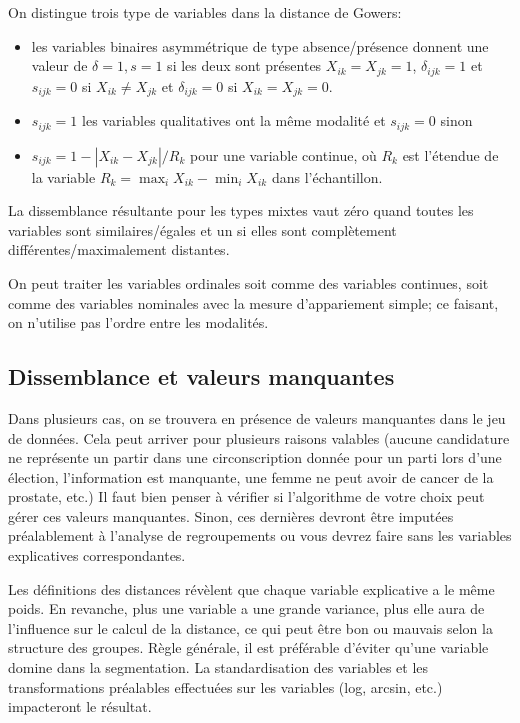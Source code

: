 \documentclass[
  11pt,
  letterpaper,
]{scrbook}
\providecommand{\tightlist}{%
  \setlength{\itemsep}{0pt}\setlength{\parskip}{0pt}}\usepackage{longtable,booktabs,array}
\theoremstyle{definition}
\theoremstyle{remark}
\begin{document}
On distingue trois type de variables dans la distance de Gowers:

\begin{itemize}
\tightlist
\item
  les variables binaires asymmétrique de type absence/présence donnent
  une valeur de \(\delta=1, s=1\) si les deux sont présentes
  \(X_{ik}=X_{jk}=1\), \(\delta_{ijk}=1\) et \(s_{ijk}=0\) si
  \(X_{ik} \neq X_{jk}\) et \(\delta_{ijk}=0\) si \(X_{ik}=X_{jk}=0\).
\item
  \(s_{ijk}=1\) les variables qualitatives ont la même modalité et
  \(s_{ijk}=0\) sinon
\item
  \(s_{ijk} = 1-|X_{ik}-X_{jk}|/R_k\) pour une variable continue, où
  \(R_k\) est l'étendue de la variable
  \(R_k=\max_{i} X_{ik} - \min_i X_{ik}\) dans l'échantillon.
\end{itemize}

La dissemblance résultante pour les types mixtes vaut zéro quand toutes
les variables sont similaires/égales et un si elles sont complètement
différentes/maximalement distantes.

On peut traiter les variables ordinales soit comme des variables
continues, soit comme des variables nominales avec la mesure
d'appariement simple; ce faisant, on n'utilise pas l'ordre entre les
modalités.

\hypertarget{dissemblance-et-valeurs-manquantes}{%
\subsection{Dissemblance et valeurs
manquantes}\label{dissemblance-et-valeurs-manquantes}}

Dans plusieurs cas, on se trouvera en présence de valeurs manquantes
dans le jeu de données. Cela peut arriver pour plusieurs raisons
valables (aucune candidature ne représente un partir dans une
circonscription donnée pour un parti lors d'une élection, l'information
est manquante, une femme ne peut avoir de cancer de la prostate, etc.)
Il faut bien penser à vérifier si l'algorithme de votre choix peut gérer
ces valeurs manquantes. Sinon, ces dernières devront être imputées
préalablement à l'analyse de regroupements ou vous devrez faire sans les
variables explicatives correspondantes.

Les définitions des distances révèlent que chaque variable explicative a
le même poids. En revanche, plus une variable a une grande variance,
plus elle aura de l'influence sur le calcul de la distance, ce qui peut
être bon ou mauvais selon la structure des groupes. Règle générale, il
est préférable d'éviter qu'une variable domine dans la segmentation. La
standardisation des variables et les transformations préalables
effectuées sur les variables (log, arcsin, etc.) impacteront le
résultat.
\end{document}
